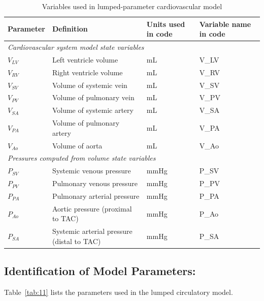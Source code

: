 \documentclass[fleqn,10pt]{physiome}
\begin{document}
\begin{table}[ht]\centering
\small
\caption{Variables used in lumped-parameter cardiovascular model}\label{tab:10}
\begin{tabular}{l l l l}
\toprule
Parameter & Definition & Units used in code & Variable name in code \\
\midrule
\multicolumn{4}{l}{\em Cardiovascular system model state variables} \\
$V_{LV}$ & Left ventricle volume & mL & V\_LV \\
$V_{RV}$ & Right ventricle volume & mL & V\_RV \\
$V_{SV}$ & Volume of systemic vein & mL & V\_SV \\
$V_{PV}$ & Volume of pulmonary vein & mL & V\_PV \\
$V_{SA}$ & Volume of systemic artery & mL & V\_SA \\
$V_{PA}$ & Volume of pulmonary artery & mL & V\_PA \\
$V_{Ao}$ & Volume of aorta & mL & V\_Ao \\

\multicolumn{4}{l}{\em Pressures computed from volume state variables} \\
$P_{SV}$ & Systemic venous pressure & mmHg & P\_SV \\
$P_{PV}$ & Pulmonary venous pressure & mmHg & P\_PV \\
$P_{PA}$ & Pulmonary arterial pressure & mmHg & P\_PA \\
$P_{Ao}$ & Aortic pressure (proximal to TAC) & mmHg & P\_Ao \\
$P_{SA}$ & Systemic arterial pressure (distal to TAC) & mmHg & P\_SA \\

\bottomrule
\end{tabular}
\end{table}

\subsection{Identification of Model Parameters:}

Table~\ref{tab:11} lists the parameters used in the lumped circulatory model.
\end{document}
